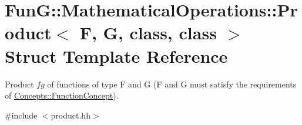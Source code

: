 \hypertarget{structFunG_1_1MathematicalOperations_1_1Product}{\section{\-Fun\-G\-:\-:\-Mathematical\-Operations\-:\-:\-Product$<$ \-F, \-G, class, class $>$ \-Struct \-Template \-Reference}
\label{structFunG_1_1MathematicalOperations_1_1Product}
}


\-Product $fg$ of functions of type \-F and \-G (\-F and \-G must satisfy the requirements of \hyperlink{structFunG_1_1Concepts_1_1FunctionConcept}{\-Concepts\-::\-Function\-Concept}).  




{\ttfamily \#include $<$product.\-hh$>$}

